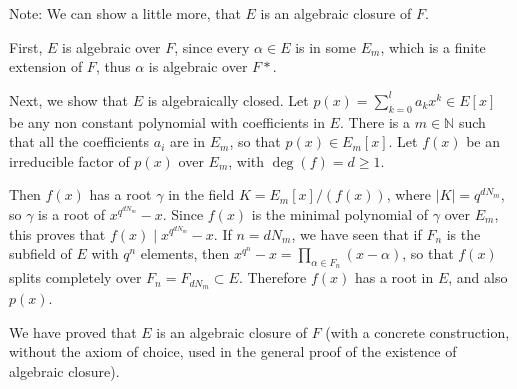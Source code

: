 \documentclass[11pt,a4paper]{article}
\newcommand{\N}{\mathbb{N}}
\begin{document}
\bigskip
Note: We can show a little more, that $E$ is an algebraic closure of $F$.

First, $E$ is algebraic over $F$, since every $\alpha \in E$ is in some $E_m$, which is a finite extension of $F$, thus $\alpha$ is algebraic over $F*$.

Next, we show that $E$ is algebraically closed. Let $p(x) = \sum_{k=0}^l a_k x^k \in E[x]$ be any non constant polynomial with coefficients in $E$. There is a $m\in \N$ such that all the coefficients $a_i$ are in $E_m$, so that $p(x) \in E_m[x]$. Let $f(x)$ be an irreducible factor of $p(x)$ over $E_m$, with $\deg(f) = d \geq 1$.

Then $f(x)$ has a root $\gamma$ in the field $K = E_m[x]/(f(x))$, where $|K| = q^{dN_m}$, so $\gamma$ is a root of $x^{q^{dN_m}} - x$. Since $f(x)$ is the minimal polynomial of $\gamma$ over $E_m$, this proves that $f(x) \mid x^{q^{dN_m}} - x$. If $n = dN_m$, we have seen that if $F_n$ is the subfield of $E$ with $q^n$ elements, then  $x^{q^n} - x =\prod_{\alpha \in F_n} (x - \alpha)$, so that $f(x)$ splits completely over $F_n = F_{dN_m} \subset E$. Therefore $f(x)$ has a root in $E$, and also $p(x)$.

We have proved that $E$ is an algebraic closure of $F$ (with a concrete construction, without the axiom of choice, used in the general proof of the existence of algebraic closure).
\end{document}
